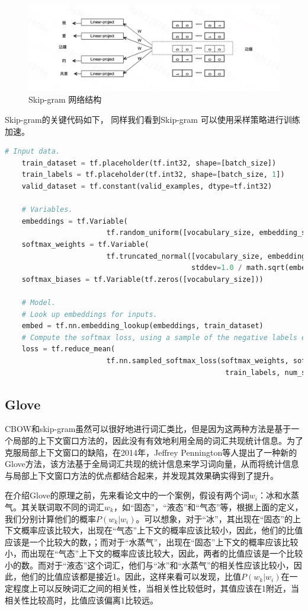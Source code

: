 \documentclass[twoside,a4paper,12pt]{book}%
\begin{document}
\begin{figure}[htbp]
\begin{center}
\includegraphics[width=5.8in]{figures/skip-gram1.png}
\caption{Skip-gram 网络结构}
\label{fig:skip-gram1}
\end{center}
\end{figure}
Skip-gram的关键代码如下， 同样我们看到Skip-gram 可以使用采样策略进行训练加速。

\begin{lstlisting}[language={python}]
# Input data.
	train_dataset = tf.placeholder(tf.int32, shape=[batch_size])
	train_labels = tf.placeholder(tf.int32, shape=[batch_size, 1])
	valid_dataset = tf.constant(valid_examples, dtype=tf.int32)

	# Variables.
	embeddings = tf.Variable(
						tf.random_uniform([vocabulary_size, embedding_size], -1.0, 1.0))
	softmax_weights = tf.Variable(
						tf.truncated_normal([vocabulary_size, embedding_size],
											stddev=1.0 / math.sqrt(embedding_size)))
	softmax_biases = tf.Variable(tf.zeros([vocabulary_size]))

	# Model.
	# Look up embeddings for inputs.
	embed = tf.nn.embedding_lookup(embeddings, train_dataset)
	# Compute the softmax loss, using a sample of the negative labels each time.
	loss = tf.reduce_mean(
						tf.nn.sampled_softmax_loss(softmax_weights, softmax_biases, embed,
													train_labels, num_sampled, vocabulary_size))
\end{lstlisting}
\subsection{Glove}
\gls{CBOW}和skip-gram虽然可以很好地进行词汇类比，但是因为这两种方法是基于一个局部的上下文窗口方法的，因此没有有效地利用全局的词汇共现统计信息。为了克服局部上下文窗口的缺陷，在2014年，Jeffrey Pennington等人提出了一种新的\gls{Glove}方法，该方法基于全局词汇共现的统计信息来学习词向量，从而将统计信息与局部上下文窗口方法的优点都结合起来，并发现其效果确实得到了提升。

在介绍\gls{Glove}的原理之前，先来看论文中的一个案例，假设有两个词$w_i$：冰和水蒸气。其关联词取不同的词汇$w_k$，如“固态”，“液态”和“气态”等，根据上面的定义，我们分别计算他们的概率$P(w_{k}|w_{i})$。可以想象，对于“冰”，其出现在“固态”的上下文概率应该比较大，出现在“气态”上下文的概率应该比较小，因此，他们的比值应该是一个比较大的数，；而对于“水蒸气”，出现在“固态”上下文的概率应该比较小，而出现在“气态”上下文的概率应该比较大，因此，两者的比值应该是一个比较小的数。而对于“液态”这个词汇，他们与“冰”和“水蒸气”的相关性应该比较小，因此，他们的比值应该都是接近1。因此，这样来看可以发现，比值$P(w_k | w_i)$在一定程度上可以反映词汇之间的相关性，当相关性比较低时，其值应该在1附近，当相关性比较高时，比值应该偏离1比较远。
\end{document}

